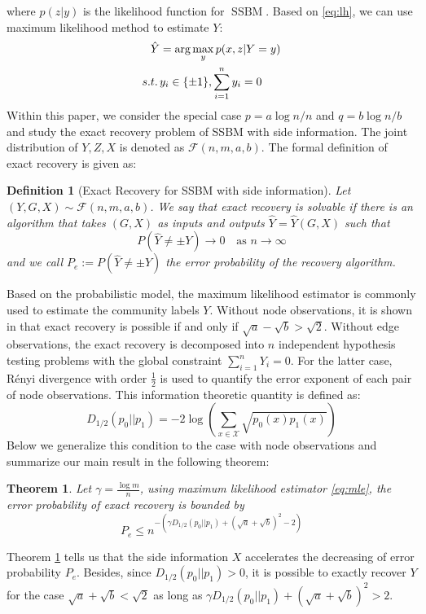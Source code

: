 \documentclass[conference]{IEEEtran}
\newtheorem{definition}{Definition}
\newtheorem{theorem}{Theorem}
\DeclareMathOperator{\SSBM}{SSBM}
\begin{document}
where $p(z|y)$ is the likelihood function for $\SSBM$.
Based on \eqref{eq:lh}, we can use maximum likelihood method to estimate
$Y$:
\begin{align}
    \hat{Y} &= \arg\max_y p(x,z|Y=y) \notag \\
    s.t.\, & y_i \in \{\pm 1\}, \sum_{i=1}^n y_i=0 \label{eq:mle}
\end{align}
Within this paper, we consider the special case $p = a \log n /n$ and $q = b \log n / b$ and study
the exact recovery problem of SSBM with side information. The joint distribution
of $Y,Z, X$ is denoted as $\mathcal{F}(n,m,a,b)$.
The formal definition of exact
recovery is given as:
\begin{definition}[Exact Recovery for SSBM with side information]
		Let $(Y,G,X) \sim \mathcal{F}(n,m,a,b)$.
		We say that exact recovery is solvable if there is an algorithm that takes $(G,X)$ as inputs and outputs $\hat{Y}=\hat{Y}(G,X)$ such that
		$$
		P(\hat{Y} \neq \pm Y) \to 0
		\text{~~~as~} n\to\infty
		$$
		and we call $P_e:=P(\hat{Y} \neq \pm Y)$ the error probability of the recovery algorithm.
\end{definition}
Based on the probabilistic model, the maximum likelihood estimator
is commonly used to estimate the community labels $Y$.
Without node observations, it is shown in \cite{abbe2015exact}
that exact recovery is possible if and only if $\sqrt{a} - \sqrt{b} > \sqrt{2}$.
Without edge observations, the exact recovery is decomposed into $n$
independent hypothesis testing problems with the global constraint $\sum_{i=1}^n Y_i=0$. For the latter case, Rényi divergence with order $\frac{1}{2}$
is used to quantify the error exponent of each pair of node observations.
This information theoretic quantity is defined as:
\begin{equation}
    D_{1/2}(p_0 || p_1) = -2\log(\sum_{x \in \mathcal{X}} \sqrt{p_0(x)p_1(x)} )
\end{equation}
Below we generalize this condition to the case with node observations and summarize
our main result in the following theorem:
\begin{theorem}\label{thm:Pe}
Let $\gamma = \frac{\log m}{n}$, using maximum likelihood estimator \eqref{eq:mle}, the error probability
of exact recovery is bounded by
\begin{equation}
    P_e \leq n^{-\left(\gamma D_{1/2}(p_0||p_1) + (\sqrt{a} + \sqrt{b})^2-2\right)}
\end{equation}
\end{theorem}
Theorem \ref{thm:Pe} tells us that the side information $X$ accelerates the
decreasing of error probability $P_e$. Besides, since 
$D_{1/2}(p_0||p_1) > 0$, it is possible to exactly recover $Y$
for the case $\sqrt{a} + \sqrt{b} < \sqrt{2}$ as long as $\gamma D_{1/2}(p_0||p_1) + (\sqrt{a} + \sqrt{b})^2 > 2$.
\end{document}
